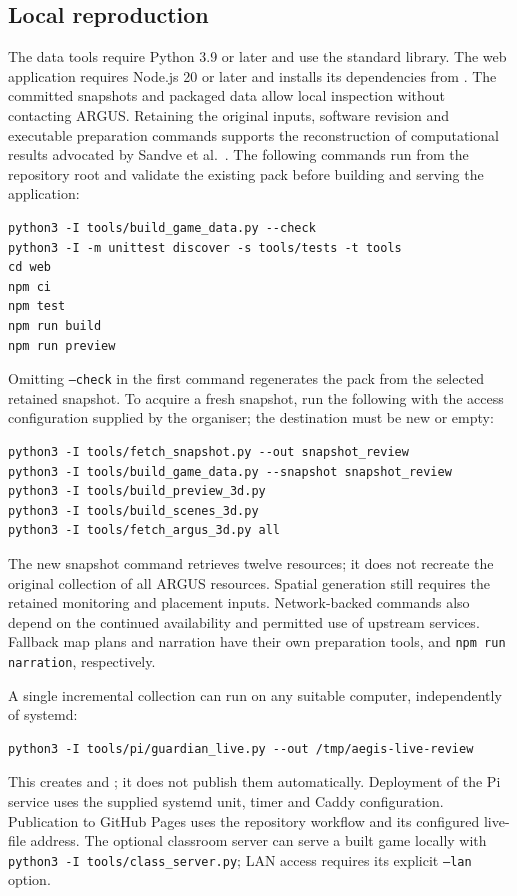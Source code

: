 \documentclass[10pt,a4paper]{article}
\begin{document}
\subsection{Local reproduction}
The data tools require Python 3.9 or later and use the standard library. The web application requires Node.js 20 or later and installs its dependencies from . The committed snapshots and packaged data allow local inspection without contacting ARGUS. Retaining the original inputs, software revision and executable preparation commands supports the reconstruction of computational results advocated by Sandve et al.~\cite{sandve2013}. The following commands run from the repository root and validate the existing pack before building and serving the application:
\begin{lstlisting}
python3 -I tools/build_game_data.py --check
python3 -I -m unittest discover -s tools/tests -t tools
cd web
npm ci
npm test
npm run build
npm run preview
\end{lstlisting}

\noindent Omitting \texttt{--check} in the first command regenerates the pack from the selected retained snapshot. To acquire a fresh snapshot, run the following with the access configuration supplied by the organiser; the destination must be new or empty:
\begin{lstlisting}
python3 -I tools/fetch_snapshot.py --out snapshot_review
python3 -I tools/build_game_data.py --snapshot snapshot_review
python3 -I tools/build_preview_3d.py
python3 -I tools/build_scenes_3d.py
python3 -I tools/fetch_argus_3d.py all
\end{lstlisting}

\noindent The new snapshot command retrieves twelve resources; it does not recreate the original collection of all ARGUS resources. Spatial generation still requires the retained monitoring and placement inputs. Network-backed commands also depend on the continued availability and permitted use of upstream services. Fallback map plans and narration have their own preparation tools,  and \texttt{npm run narration}, respectively.

A single incremental collection can run on any suitable computer, independently of systemd:
\begin{lstlisting}
python3 -I tools/pi/guardian_live.py --out /tmp/aegis-live-review
\end{lstlisting}

\noindent This creates  and ; it does not publish them automatically. Deployment of the Pi service uses the supplied systemd unit, timer and Caddy configuration. Publication to GitHub Pages uses the repository workflow and its configured live-file address. The optional classroom server can serve a built game locally with \texttt{python3 -I tools/class\_server.py}; LAN access requires its explicit \texttt{--lan} option.
\end{document}
